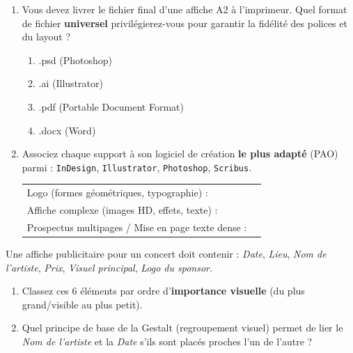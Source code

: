 \documentclass[11pt]{article}
\begin{document}
\begin{exercice}
\begin{enumerate}
    \item Vous devez livrer le fichier final d'une affiche A2 à l'imprimeur. Quel format de fichier \textbf{universel} privilégierez-vous pour garantir la fidélité des polices et du layout ?
    \begin{enumerate}
        \item .psd (Photoshop) \item .ai (Illustrator) \item .pdf (Portable Document Format) \item .docx (Word)
    \end{enumerate}
    \item Associez chaque support à son logiciel de création \textbf{le plus adapté} (PAO) parmi : \texttt{InDesign}, \texttt{Illustrator}, \texttt{Photoshop}, \texttt{Scribus}.
    \begin{tabular}{ll}
        Logo (formes géométriques, typographie) : & \underline{\hspace{5cm}} \\
        Affiche complexe (images HD, effets, texte) : & \underline{\hspace{5cm}} \\
        Prospectus multipages / Mise en page texte dense : & \underline{\hspace{5cm}} \\
    \end{tabular}
\end{enumerate}
\end{exercice}

\begin{exercice}
Une affiche publicitaire pour un concert doit contenir : \textit{Date}, \textit{Lieu}, \textit{Nom de l'artiste}, \textit{Prix}, \textit{Visuel principal}, \textit{Logo du sponsor}.
\begin{enumerate}
    \item Classez ces 6 éléments par ordre d'\textbf{importance visuelle} (du plus grand/visible au plus petit).
    \item Quel principe de base de la Gestalt (regroupement visuel) permet de lier le \textit{Nom de l'artiste} et la \textit{Date} s'ils sont placés proches l'un de l'autre ?
\end{enumerate}
\end{exercice}
\end{document}
